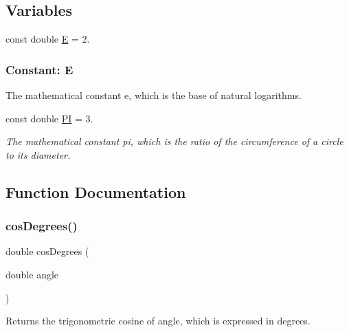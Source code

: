 \subsection*{Variables}
\begin{DoxyCompactItemize}
\item 
const double \mbox{\hyperlink{namespacesgl_1_1math_ab587ba72a9c23f238cb4fd70e2fdb545}{E}} = 2.
\begin{DoxyCompactList}\small\item\em \subsubsection*{Constant\+: E }

The mathematical constant e, which is the base of natural logarithms. \end{DoxyCompactList}\item 
const double \mbox{\hyperlink{namespacesgl_1_1math_a952eac791b596a61bba0a133a3bb439f}{PI}} = 3.
\begin{DoxyCompactList}\small\item\em The mathematical constant pi, which is the ratio of the circumference of a circle to its diameter. \end{DoxyCompactList}\end{DoxyCompactItemize}


\subsection{Function Documentation}
\mbox{\label{namespacesgl_1_1math_a6e4c47a9bfc745fbb9b66465054273a9}} 
\subsubsection{\texorpdfstring{cos\+Degrees()}{cosDegrees()}}
{\footnotesize\ttfamily double cos\+Degrees (\begin{DoxyParamCaption}\item[{double}]{angle }\end{DoxyParamCaption})}



Returns the trigonometric cosine of {\ttfamily angle}, which is expressed in degrees. 

\mbox{\label{namespacesgl_1_1math_a58fd413b2441967caf5813ad8f8b26f1}} 
